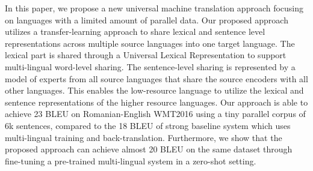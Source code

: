 In this paper, we propose a new universal machine translation approach focusing on languages with a limited amount of parallel data.  Our proposed approach utilizes a transfer-learning approach to share lexical and sentence level representations across multiple source languages into one target language. The lexical part is shared through a  Universal Lexical Representation to support multi-lingual word-level sharing. The sentence-level sharing is represented by a model of experts from all source languages that share the source encoders with all other languages. This enables the low-resource language to utilize the lexical and sentence representations of the higher resource languages. Our approach is able to achieve 23 BLEU on Romanian-English WMT2016 using a tiny parallel corpus of 6k sentences, compared to the 18 BLEU of strong baseline system which uses multi-lingual training and back-translation. Furthermore, we show that the proposed approach can achieve almost 20 BLEU on the same dataset through fine-tuning a pre-trained multi-lingual system in a zero-shot setting.
